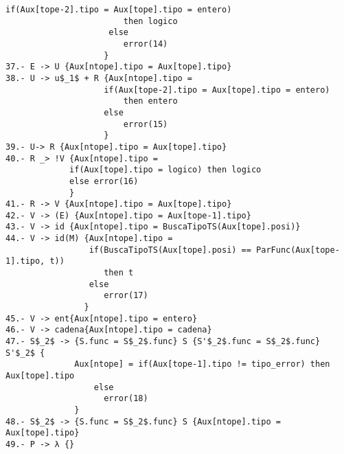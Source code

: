 \documentclass[a4paper, 12pt]{article}
\begin{document}
\begin{lstlisting}[style=EstadosAutomataST]
                     if(Aux[tope-2].tipo = Aux[tope].tipo = entero)
                        then logico
                     else
                        error(14)
                    }
37.- E -> U {Aux[ntope].tipo = Aux[tope].tipo}
38.- U -> u$_1$ + R {Aux[ntope].tipo =
                    if(Aux[tope-2].tipo = Aux[tope].tipo = entero)
                        then entero
                    else
                        error(15)
                    }
39.- U-> R {Aux[ntope].tipo = Aux[tope].tipo}
40.- R _> !V {Aux[ntope].tipo =
             if(Aux[tope].tipo = logico) then logico
             else error(16)
             }
41.- R -> V {Aux[ntope].tipo = Aux[tope].tipo}
42.- V -> (E) {Aux[ntope].tipo = Aux[tope-1].tipo}
43.- V -> id {Aux[ntope].tipo = BuscaTipoTS(Aux[tope].posi)}
44.- V -> id(M) {Aux[ntope].tipo =
                 if(BuscaTipoTS(Aux[tope].posi) == ParFunc(Aux[tope-1].tipo, t))
                    then t
                 else
                    error(17)
                }
45.- V -> ent{Aux[ntope].tipo = entero}
46.- V -> cadena{Aux[ntope].tipo = cadena}
47.- S$_2$ -> {S.func = S$_2$.func} S {S'$_2$.func = S$_2$.func} S'$_2$ {
              Aux[ntope] = if(Aux[tope-1].tipo != tipo_error) then Aux[tope].tipo
                  else
                    error(18)
              }
48.- S$_2$ -> {S.func = S$_2$.func} S {Aux[ntope].tipo = Aux[tope].tipo}
49.- P -> λ {}

\end{lstlisting}
\end{document}
